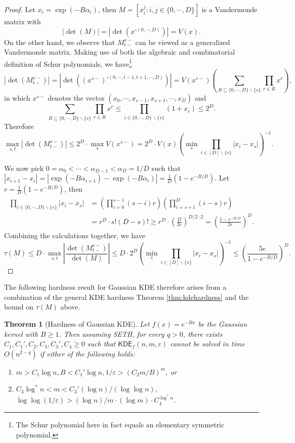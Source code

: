 \documentclass[10pt,a4paper]{article}
\newtheorem{theorem}{Theorem}
\theoremstyle{remark}
\numberwithin{equation}{section}
\numberwithin{theorem}{section}
\newcommand{\eps}{\varepsilon}
\newcommand{\KDE}{\mathsf{KDE}}
\begin{document}
\begin{proof}
Let $x_i = \exp(-B\alpha_i)$, then
$M = [x_i^j: i, j \in \{0, \cdots, D\}]$ is a Vandermonde matrix with
\[|\det(M)| = |\det(x^{\circ(0, \cdots, D)})| = V(x).\]
On the other hand, we observe that $M_{t-}^{s-}$ can be viewed as a generalized Vandermonde matrix. Making use of both the algebraic and combinatorial definition of Schur polynomials, we have\footnote{The Schur polynomial here in fact equals an elementary symmetric polynomial.}
\[|\det (M_{t-}^{s-})| = |\det((x^{s-})^{\circ(0, \cdots, t-1, t+1, \cdots, D)})|
= V(x^{s-}) \left( \sum_{R\subseteq \{0, \cdots, D\}\backslash\{s\}}\prod_{r\in R}x^r \right),\]
in which $x^{s-}$ denotes the vector $(x_0, \cdots, x_{s-1}, x_{s+1}, \cdots, x_D)$ and
\[\sum_{R\subseteq \{0, \cdots, D\}\backslash\{s\}}\prod_{r\in R}x^r 
\le \prod_{i \in \{0, \cdots, D\} \backslash \{s\}}(1 + x_i) \le 2^D.\]
Therefore
\[\max_{s, t} |\det (M_{t-}^{s-})|
\le 2^D \cdot \max_s V(x^{s-}) = 2^D \cdot V(x)
\left( \min_s \prod_{i \in [D]\backslash \{s\}} |x_i - x_s| \right)^{-1}. \]

We now pick $0 = \alpha_0 < \cdots < \alpha_{D-1} < \alpha_{D} = 1/D$ such that
$|x_{i+1} - x_i| = |\exp(-B\alpha_{i+1}) - \exp(-B\alpha_i)|
= \frac 1{D}(1 - e^{-B/D})$. Let $r = \frac 1{D}(1 - e^{-B/D})$, then
\begin{align*}
\prod_{i \in \{0, \cdots, D\} \backslash \{s\}} |x_i - x_s|
&= \left(\prod_{i=0}^{s-1} (s - i) r \right)
\left(\prod_{i=s+1}^{D} (i-s) r\right) \\
&= r^{D} \cdot s! (D-s)!
\ge r^{D} \cdot (\frac{D}{2e})^{D/2 \cdot 2} = (\frac{1 - e^{-B/D}}{2e})^{D}.
\end{align*}
Combining the calculations together, we have
\[\tau(M) \le D \cdot \max_{s, t}\left|\frac{\det(M^{s-}_{t-})}{\det(M)}\right| 
\le D \cdot 2^D\left( \min_s \prod_{i \in [D]\backslash \{s\}} |x_i - x_s| \right)^{-1} \le \left(\frac{5e}{1 - e^{-B/D}}\right)^D.\]
\end{proof}

The following hardness result for Gaussian KDE therefore arises from a combination of the general KDE hardness Theorem \ref{thm:kdehardness} and the bound on $\tau(M)$ above.

\begin{theorem}[Hardness of Gaussian KDE]
Let $f(x) = e^{-Bx}$ be the Gaussian kernel with $B \ge 1$.
Then assuming SETH, for every $q > 0$, there exists $C_1, C_1', C_2, C_3, C_3', C_4 \ge 0$ such that $\KDE_f(n, m, \eps)$ cannot be solved in time $O(n^{2-q})$ if either of the following holds:
\begin{enumerate}[(1)]
\item $m > C_1\log n, B < C_1'\log n, 1/\eps > (C_2m/B)^m$, or
\item $C_3\log^* n < m < C_3'(\log n)/(\log\log n)$, $\log\log(1/\eps) > (\log n)/m \cdot (\log m) \cdot C_4^{\log^*n}$.
\end{enumerate}
\end{theorem}
\end{document}
